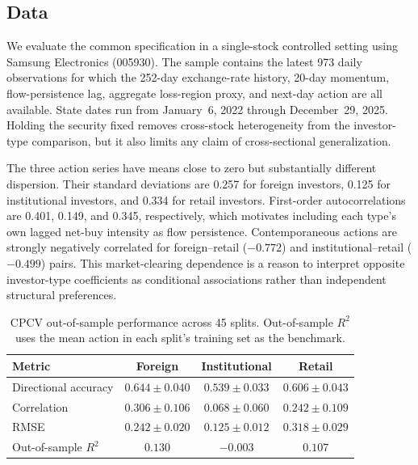 \documentclass[sigconf,anonymous,review]{acmart}
\begin{document}
\subsection{Data}
\label{sec:exp-data}

We evaluate the common specification in a single-stock controlled setting using
Samsung Electronics (005930). The sample contains the latest 973 daily
observations for which the 252-day exchange-rate history, 20-day momentum,
flow-\hspace{0pt}persistence lag, aggregate loss-\hspace{0pt}region proxy, and
 next-day action are all
available. State dates run from January~6, 2022 through December~29, 2025.
Holding the security fixed removes cross-stock heterogeneity from the
investor-type comparison, but it also limits any claim of cross-sectional
generalization.

The three action series have means close to zero but substantially different
dispersion. Their standard deviations are 0.257 for foreign investors, 0.125 for
institutional investors, and 0.334 for retail investors. First-order
autocorrelations are 0.401, 0.149, and 0.345, respectively, which motivates
including each type's own lagged net-buy intensity as flow persistence.
Contemporaneous actions are strongly negatively correlated for foreign--retail
($-0.772$) and institutional--retail ($-0.499$) pairs. This market-clearing
dependence is a reason to interpret opposite investor-type coefficients as
conditional associations rather than independent structural preferences.

\begin{table}[t]
\caption{CPCV out-of-sample performance across 45 splits. Out-of-sample $R^2$
uses the mean action in each split's training set as the benchmark.}
\label{tab:cpcv-performance}
\small
\setlength{\tabcolsep}{3.5pt}
\begin{tabular}{lccc}
\toprule
Metric & Foreign & Institutional & Retail \\
\midrule
Directional accuracy & $0.644 \pm 0.040$ & $0.539 \pm 0.033$ & $0.606 \pm 0.043$ \\
Correlation          & $0.306 \pm 0.106$ & $0.068 \pm 0.060$ & $0.242 \pm 0.109$ \\
RMSE                 & $0.242 \pm 0.020$ & $0.125 \pm 0.012$ & $0.318 \pm 0.029$ \\
Out-of-sample $R^2$  & $0.130$           & $-0.003$          & $0.107$ \\
\bottomrule
\end{tabular}
\end{table}
\end{document}
